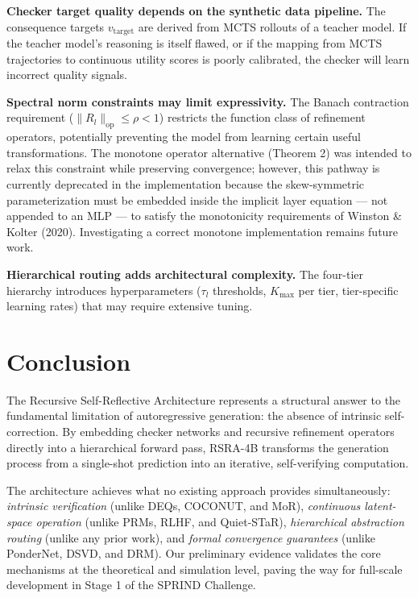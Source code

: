\documentclass[11pt,a4paper]{article}
\theoremstyle{definition}
\begin{document}
\textbf{Checker target quality depends on the synthetic data pipeline.} The consequence targets $v_{\text{target}}$ are derived from MCTS rollouts of a teacher model. If the teacher model's reasoning is itself flawed, or if the mapping from MCTS trajectories to continuous utility scores is poorly calibrated, the checker will learn incorrect quality signals.

\textbf{Spectral norm constraints may limit expressivity.} The Banach contraction requirement ($\|R_l\|_{\text{op}} \leq \rho < 1$) restricts the function class of refinement operators, potentially preventing the model from learning certain useful transformations. The monotone operator alternative (Theorem 2) was intended to relax this constraint while preserving convergence; however, this pathway is currently deprecated in the implementation because the skew-symmetric parameterization must be embedded inside the implicit layer equation --- not appended to an MLP --- to satisfy the monotonicity requirements of Winston \& Kolter (2020). Investigating a correct monotone implementation remains future work.

\textbf{Hierarchical routing adds architectural complexity.} The four-tier hierarchy introduces hyperparameters ($\tau_l$ thresholds, $K_{\max}$ per tier, tier-specific learning rates) that may require extensive tuning.

\section{Conclusion}

The Recursive Self-Reflective Architecture represents a structural answer to the fundamental limitation of autoregressive generation: the absence of intrinsic self-correction. By embedding checker networks and recursive refinement operators directly into a hierarchical forward pass, RSRA-4B transforms the generation process from a single-shot prediction into an iterative, self-verifying computation.

The architecture achieves what no existing approach provides simultaneously: \textit{intrinsic verification} (unlike DEQs, COCONUT, and MoR), \textit{continuous latent-space operation} (unlike PRMs, RLHF, and Quiet-STaR), \textit{hierarchical abstraction routing} (unlike any prior work), and \textit{formal convergence guarantees} (unlike PonderNet, DSVD, and DRM). Our preliminary evidence validates the core mechanisms at the theoretical and simulation level, paving the way for full-scale development in Stage 1 of the SPRIND Challenge.
\end{document}
